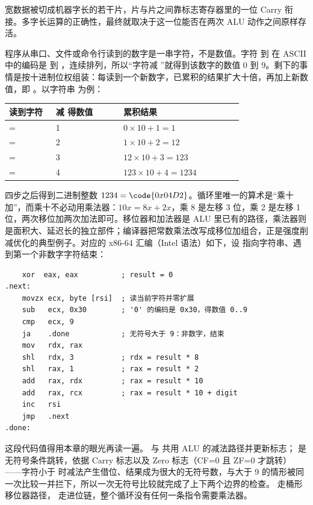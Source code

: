 宽数据被切成机器字长的若干片，片与片之间靠标志寄存器里的一位 Carry 衔接。多字长运算的正确性，最终就取决于这一位能否在两次 ALU 动作之间原样存活。

程序从串口、文件或命令行读到的数字是一串字符，不是数值。字符  到  在 ASCII 中的编码是  到 ，连续排列，所以“字符减 ”就得到该数字的数值 0 到 9。剩下的事情是按十进制位权组装：每读到一个新数字，已累积的结果扩大十倍，再加上新数值，即 。以字符串  为例：

\begin{longtable}{L{0.18\linewidth}L{0.26\linewidth}L{0.46\linewidth}}
\toprule
读到字符 & 减  得数值 & 累积结果  \\
\midrule
{} =  & 1 & $0\times10+1=1$ \\
 =  & 2 & $1\times10+2=12$ \\
 =  & 3 & $12\times10+3=123$ \\
 =  & 4 & $123\times10+4=1234$ \\
\bottomrule
\end{longtable}

四步之后得到二进制整数 $1234=\code{0x04D2}$。循环里唯一的算术是“乘十加”，而乘十不必动用乘法器：$10x=8x+2x$，乘 8 是左移 3 位，乘 2 是左移 1 位，两次移位加两次加法即可。移位器和加法器是 ALU 里已有的路径，乘法器则是面积大、延迟长的独立部件；编译器把常数乘法改写成移位加组合，正是强度削减优化的典型例子。对应的 x86-64 汇编（Intel 语法）如下，设  指向字符串、遇到第一个非数字字符结束：

\begin{lstlisting}
    xor  eax, eax          ; result = 0
.next:
    movzx ecx, byte [rsi]  ; 读当前字符并零扩展
    sub   ecx, 0x30        ; '0' 的编码是 0x30，得数值 0..9
    cmp   ecx, 9
    ja    .done            ; 无符号大于 9：非数字，结束
    mov   rdx, rax
    shl   rdx, 3           ; rdx = result * 8
    shl   rax, 1           ; rax = result * 2
    add   rax, rdx         ; rax = result * 10
    add   rax, rcx         ; rax = result * 10 + digit
    inc   rsi
    jmp   .next
.done:
\end{lstlisting}

这段代码值得用本章的眼光再读一遍。 与  共用 ALU 的减法路径并更新标志； 是无符号条件跳转，依据 Carry 标志以及 Zero 标志（CF=0 且 ZF=0 才跳转）——字符小于  时减法产生借位、结果成为很大的无符号数，与大于 9 的情形被同一次比较一并拦下，所以一次无符号比较就完成了上下两个边界的检查。 走桶形移位器路径， 走进位链，整个循环没有任何一条指令需要乘法器。

